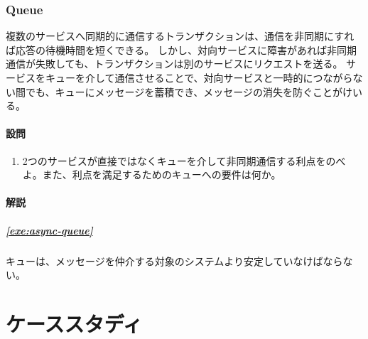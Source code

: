 \documentclass{jlreq}
\begin{document}
\section{Queue}
\begin{refsection}
  複数のサービスへ同期的に通信するトランザクションは、通信を非同期にすれば応答の待機時間を短くできる。
  しかし、対向サービスに障害があれば非同期通信が失敗しても、トランザクションは別のサービスにリクエストを送る。
  サービスをキューを介して通信させることで、対向サービスと一時的につながらない間でも、キューにメッセージを蓄積でき、メッセージの消失を防ぐことがけいる\cite{lc-isc}。
  \subsection{設問}
  \begin{enumerate}[label=問題\arabic*,labelsep=10pt,leftmargin=*]
  \item 2つのサービスが直接ではなくキューを介して非同期通信する利点をのべよ。また、利点を満足するためのキューへの要件は何か。\label{exe:async-queue}
  \end{enumerate}
  \subsection{解説}
  \subsubsection*{\ref{exe:async-queue}}
  キューは、メッセージを仲介する対象のシステムより安定していなけばならない。
  \printjbibliography
  
\end{refsection}
\part{ケーススタディ}
\end{document}
